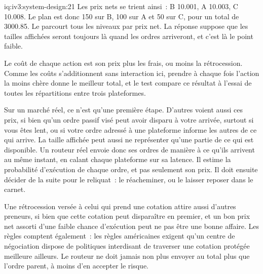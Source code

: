 \begin{solution}{iq:iv3:system-design:21}
Les prix nets se trient ainsi~: B 10.001, A 10.003, C 10.008. Le plan est donc 150 sur B, 100 sur A et 50 sur C, pour un total de 3000.85. Le  parcourt tous les niveaux par prix net. La réponse suppose que les tailles affichées seront toujours là quand les ordres arriveront, et c'est là le point faible.
\enlargethispage{-3\baselineskip}%
\label{lst:iv3:sd:route}

Le coût de chaque action est son prix plus les frais, ou moins la rétrocession. Comme les coûts s'additionnent sans interaction ici, prendre à chaque fois l'action la moins chère donne le meilleur total, et le test compare ce résultat à l'essai de toutes les répartitions entre trois plateformes.

Sur un marché réel, ce n'est qu'une première étape. D'autres voient aussi ces prix, si bien qu'un ordre passif visé peut avoir disparu à votre arrivée, surtout si vous êtes lent, ou si votre ordre adressé à une plateforme informe les autres de ce qui arrive. La taille affichée peut aussi ne représenter qu'une partie de ce qui est disponible. Un routeur réel envoie donc ses ordres de manière à ce qu'ils arrivent au même instant, en calant chaque plateforme sur sa latence. Il estime la probabilité d'exécution de chaque ordre, et pas seulement son prix. Il doit ensuite décider de la suite pour le reliquat~: le réacheminer, ou le laisser reposer dans le carnet.

Une rétrocession versée à celui qui prend une cotation attire aussi d'autres preneurs, si bien que cette cotation peut disparaître en premier, et un bon prix net assorti d'une faible chance d'exécution peut ne pas être une bonne affaire. Les règles comptent également~: les règles américaines exigent qu'un centre de négociation dispose de politiques interdisant de traverser une cotation protégée meilleure ailleurs. Le routeur ne doit jamais non plus envoyer au total plus que l'ordre parent, à moins d'en accepter le risque.

\end{solution}

